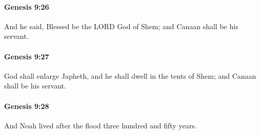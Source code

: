 		\paragraph{Genesis 9:26} %
			\label{GENESIS-9-26}

			And he said, Blessed be the LORD God of Shem; and Canaan shall be his servant.


		\paragraph{Genesis 9:27} %
			\label{GENESIS-9-27}

			God shall enlarge Japheth, and he shall dwell in the tents of Shem; and Canaan shall be his servant.


		\paragraph{Genesis 9:28} %
			\label{GENESIS-9-28}

			And Noah lived after the flood three hundred and fifty years.


